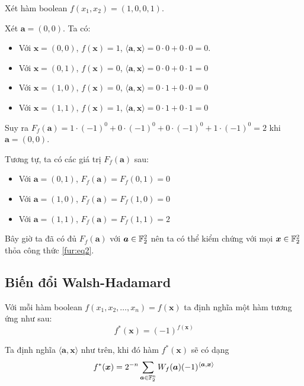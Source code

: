 \begin{example}
	Xét hàm boolean $f(x_1, x_2) = (1, 0, 0, 1)$.
	
	Xét $\bm{a} = (0, 0)$. Ta có:
	\begin{itemize}
		\item Với $\bm{x} = (0, 0)$, $f(\bm{x}) = 1$, $\langle \bm{a}, \bm{x} \rangle = 0 \cdot 0 + 0 \cdot 0 = 0$.
		\item Với $\bm{x} = (0, 1)$, $f(\bm{x}) = 0$, $\langle \bm{a}, \bm{x} \rangle = 0 \cdot 0 + 0 \cdot 1 = 0$
		\item Với $\bm{x} = (1, 0)$, $f(\bm{x}) = 0$, $\langle \bm{a}, \bm{x} \rangle = 0 \cdot 1 + 0 \cdot 0 = 0$
		\item Với $\bm{x} = (1, 1)$, $f(\bm{x}) = 1$, $\langle \bm{a}, \bm{x} \rangle = 0 \cdot 1 + 0 \cdot 1 = 0$
	\end{itemize}
	
	Suy ra $F_f (\bm{a}) = 1 \cdot (-1)^0 + 0 \cdot (-1)^0 + 0 \cdot (-1)^0
	+ 1 \cdot (-1)^0 = 2$ khi $\bm{a} = (0, 0)$.
	
	Tương tự, ta có các giá trị $F_f (\bm{a})$ sau:
	\begin{itemize}
		\item Với $\bm{a} = (0, 1)$, $F_f (\bm{a}) = F_f (0, 1) = 0$
		\item Với $\bm{a} = (1, 0)$, $F_f (\bm{a}) = F_f (1, 0) = 0$
		\item Với $\bm{a} = (1, 1)$, $F_f (\bm{a}) = F_f (1, 1) = 2$
	\end{itemize}
	
	Bây giờ ta đã có đủ $F_f(\bm{a})$ với $\bm{a} \in \mathbb{F}_2^2$ nên ta có thể kiểm chứng với mọi $\bm{x} \in \mathbb{F}_2^2$ thỏa công thức \ref{fur:eq2}.
\end{example}

\subsection*{Biến đổi Walsh-Hadamard}

Với mỗi hàm boolean $f(x_1, x_2, \ldots, x_n) = f(\bm{x})$ ta định nghĩa một hàm tương ứng như sau:
\[f^*(\bm{x}) = (-1)^{f(\bm{x})}\]

Ta định nghĩa $\langle \bm{a}, \bm{x} \rangle$ như trên, khi đó hàm $f^*(\bm{x})$ sẽ có dạng
\begin{equation}\label{walsh:eq1}
	f^*(\bm{x}) = 2^{-n} \sum_{\bm{a} \in \mathbb{F}_2^n} W_f (\bm{a}) (-1)^{\langle \bm{a}, \bm{x} \rangle}
\end{equation}

